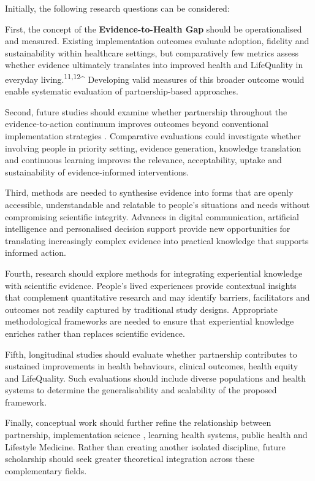 \documentclass{article}
\begin{document}
Initially, the following research questions can be considered:

First, the concept of the \textbf{\textbf{Evidence-to-Health Gap}} should be operationalised and measured. Existing implementation outcomes \cite{Proctor2011} \cite{Nilsen2015}  evaluate adoption, fidelity and sustainability within healthcare settings, but comparatively few metrics assess whether evidence ultimately translates into improved health and LifeQuality in everyday living.\textsuperscript{11,12}\^{} Developing valid measures of this broader outcome would enable systematic evaluation of partnership-based approaches.

Second, future studies should examine whether partnership throughout the evidence-to-action continuum improves outcomes beyond conventional implementation strategies \cite{Eccles2006} \cite{Straus2013}. Comparative evaluations could investigate whether involving people in priority setting, evidence generation, knowledge translation and continuous learning improves the relevance, acceptability, uptake and sustainability of evidence-informed interventions.

Third, methods are needed to synthesise evidence into forms that are openly accessible, understandable and relatable to people's situations and needs without compromising scientific integrity. Advances in digital communication, artificial intelligence \cite{WHOAI2021} \cite{Nutbeam2000}  and personalised decision support provide new opportunities for translating increasingly complex evidence into practical knowledge that supports informed action.

Fourth, research should explore methods for integrating experiential knowledge \cite{Greenhalgh2016} \cite{Cargo2008} with scientific evidence. People's lived experiences provide contextual insights that complement quantitative research and may identify barriers, facilitators and outcomes not readily captured by traditional study designs. Appropriate methodological frameworks are needed to ensure that experiential knowledge enriches rather than replaces scientific evidence.

Fifth, longitudinal studies should evaluate whether partnership contributes to sustained improvements in health behaviours, clinical outcomes, health equity \cite{Greenhalgh2016} \cite{Cargo2008}  and LifeQuality. Such evaluations should include diverse populations and health systems to determine the generalisability and scalability of the proposed framework.

Finally, conceptual work should further refine the relationship between partnership, implementation science \cite{Eccles2006} \cite{IOM2013} \cite{WHO1986} \cite{Katz2009} , learning health systems, public health and Lifestyle Medicine. Rather than creating another isolated discipline, future scholarship should seek greater theoretical integration across these complementary fields.
\end{document}
